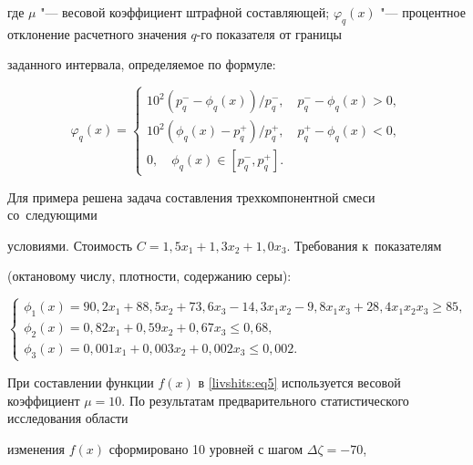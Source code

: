 где $\mu $ "--- весовой коэффициент штрафной составляющей; $\varphi _q(x)$ "--- процентное отклонение расчетного значения $q$-го показателя от границы

заданного интервала, определяемое по формуле:

\[

\varphi _q (x)=\begin{cases}

10^2\left( p_q^- -\phi _q (x) \right)/p_q^-, \quad p_q^- -\phi _q (x)>0, \\

10^2\left( \phi _q (x)-p_q^+ \right)/p_q^+ , \quad p_q^+ -\phi _q (x)<0, \\

0, \quad \phi _q (x)\in \left [p_q^-,p_q^+  \right].

\end{cases}

\]



Для примера решена задача составления трехкомпонентной смеси со~следующими

условиями. Стоимость $C=1,5x_1 +1,3x_2 +1,0x_3$. Требования к~показателям

(октановому числу, плотности, содержанию серы):

\begin{equation}

\label{livshits:eq7}

\begin{cases}

\phi_1 (x)=90,2x_1 +88,5x_2 +73,6x_3 -14,3x_1 x_2 -9,8x_1 x_3 +28,4x_1

x_2 x_3 \ge 85, \\

\phi _2 (x)=0,82x_1 +0,59x_2 +0,67x_3 \le 0,68, \\

\phi _3 (x)=0,001x_1 +0,003x_2 +0,002x_3 \le 0,002.

\end{cases}

\end{equation}



При составлении функции $f(x)$ в \eqref{livshits:eq5} используется весовой коэффициент $\mu

=10$. По результатам предварительного статистического исследования области

изменения $f(x)$ сформировано 10 уровней с шагом $\Delta \zeta =-70$,

